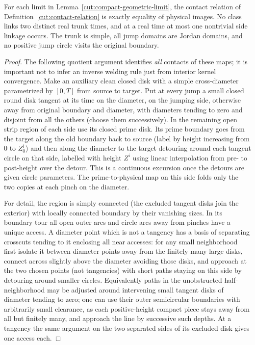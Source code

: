 \begin{lemma}
\label{cut:exact-limit-contacts}
For each limit in Lemma~\ref{cut:compact-geometric-limit}, the contact
relation of Definition~\ref{cut:contact-relation} is exactly equality of
physical images.  No class links two distinct real trunk times, and at a
real time at most one nontrivial side linkage occurs.  The trunk is simple,
all jump domains are Jordan domains, and no positive jump circle visits
the original boundary.
\end{lemma}
\begin{proof}

The following quotient argument identifies \emph{all} contacts of these maps; it is important not to infer an inverse welding rule just from interior kernel convergence.
Make an auxiliary clean closed disk with a simple cross-diameter parametrized by \([0,T]\) from source to target.
Put at every jump a small closed round disk tangent at its time on the diameter, on the jumping side, otherwise away from original boundary and diameter, with diameters tending to zero and disjoint from all the others (choose them successively).
In the remaining open strip region of each side use its closed prime disk.
Its prime boundary goes from the target along the old boundary back to source (label by height increasing from 0 to \(Z^i_0\)) and then along the diameter to the target detouring around each tangent circle on that side, labelled with height \(Z^i\) using linear interpolation from pre- to post-height over the detour.
This is a continuous excursion once the detours are given circle parameters.
The prime-to-physical map on this side folds only the two copies at each pinch on the diameter.

For detail, the region is simply connected (the excluded tangent disks join the exterior) with locally connected boundary by their vanishing sizes.
In its boundary tour all open outer arcs and circle arcs away from pinches have a unique access. A diameter point which is not a tangency has a basis of separating crosscuts tending to it enclosing all near accesses: for any small neighborhood first isolate it between diameter points away from the finitely many large disks, connect across slightly above the diameter avoiding those disks, and approach at the two chosen points (not tangencies) with short paths staying on this side by detouring around smaller circles.
Equivalently paths in the unobstructed half-neighborhood may be adjusted around intervening small tangent disks of diameter tending to zero; one can use their outer semicircular boundaries with arbitrarily small clearance, as each positive-height compact piece stays away from all but finitely many, and approach the line by successive such depths.
At a tangency the same argument on the two separated sides of its excluded disk gives one access each.


\end{proof}
